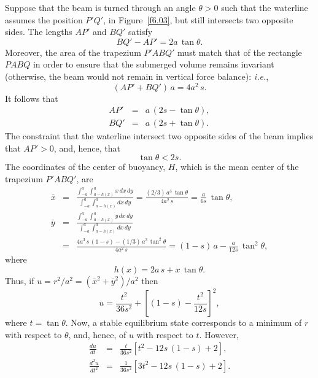 Suppose that the beam is  turned through an angle $\theta>0$ such that the waterline assumes the position $P'Q'$, in Figure~\ref{f6.03},
but still intersects two opposite sides. The lengths $AP'$ and $BQ'$ satisfy
\begin{equation}
BQ' - AP' = 2a\,\tan\theta.
\end{equation}
Moreover,  the area of the trapezium $P'ABQ'$ must match that of the  rectangle $PABQ$
in order to ensure that the submerged volume remains invariant (otherwise, the beam would not remain in vertical force balance): {\em i.e.}, 
\begin{equation}
(AP' + BQ')\,a = 4a^2\,s.
\end{equation}
It follows that
\begin{eqnarray}
AP' &=& a\,(2s-\tan\theta),\\[0.5ex]
BQ' &=& a\,(2s+\tan\theta).
\end{eqnarray} 
The constraint that the waterline intersect two opposite sides of the beam implies that $AP'>0$, and, hence, that
\begin{equation}\label{e6.57}
\tan\theta < 2s.
\end{equation}
The coordinates of the center of buoyancy, $H$, which is the mean center of the trapezium $P'ABQ'$, are
\begin{eqnarray}
\bar{x} &=& 
\frac{\int_{-a}^a\int_{a-h(x)}^a x\,dx\,dy}{\int_{-a}^a\int_{a-h(x)}^a dx\,dy} = \frac{(2/3)\,a^3\,\tan\theta}{4a^2\,s}=\frac{a}{6s}\,\tan\theta,\\[0.5ex]
\bar{y}&=&\frac{\int_{-a}^a\int_{a-h(x)}^a y\,dx\,dy}{\int_{-a}^a\int_{a-h(x)}^a dx\,dy} \nonumber\\[0.5ex]
&=& \frac{4a^3\,s\,(1-s)-(1/3)\,a^3\,\tan^2\theta}{4a^2\,s}=(1-s)\,a - \frac{a}{12s}\,\tan^2\theta,
\end{eqnarray} 
where
\begin{equation}
h(x) = 2a\,s+x\,\tan\theta.
\end{equation}
Thus, if $u=r^2/a^2=(\bar{x}^2+ \bar{y}^2)/a^2$ then
\begin{equation}
u = \frac{t^2}{36s^2} + \left[(1-s)-\frac{t^2}{12s}\right]^2,
\end{equation}
where $t=\tan\theta$. Now, a stable equilibrium state corresponds to a minimum of $r$ with respect to $\theta$, and, hence, of $u$  with respect to $t$. 
However,
\begin{eqnarray}
\frac{du}{dt} &=& \frac{t}{36s^2}\left[t^2-12s\,(1-s)+2\right],\\[0.5ex]
\frac{d^2u}{dt^2} &=& \frac{1}{36s^2}\left[3t^2-12s\,(1-s)+2\right].
\end{eqnarray}
